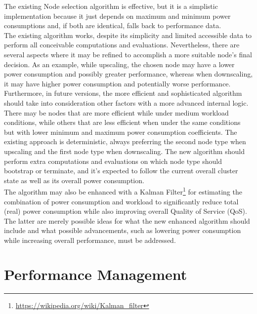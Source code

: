 The existing Node selection algorithm is effective, but it is a simplistic implementation
because it just depends on maximum and minimum power consumptions and, if both
are identical, falls back to performance data. \\ %
The existing algorithm works, despite its simplicity and limited accessible data
to perform all conceivable computations and evaluations. Nevertheless, there are
several aspects where it may be refined to accomplish a more suitable node's
final decision. As an example, while upscaling, the chosen node may have a lower
power consumption and possibly greater performance, whereas when downscaling, it
may have higher power consumption and potentially worse performance. Furthermore,
in future versions, the more efficient and sophisticated algorithm should take
into consideration other factors with a more advanced internal logic. There may be
nodes that are more efficient while under medium workload conditions, while
others that are less efficient when under the same conditions but with lower
minimum and maximum power consumption coefficients. The existing approach is deterministic,
always preferring the second node type when upscaling and the first node type
when downscaling. The new algorithm should perform extra computations and evaluations
on which node type should bootstrap or terminate, and it's expected to follow
the current overall cluster state as well as its overall power consumption. \\ %
The algorithm may also be enhanced with a Kalman Filter\footnote{\url{https://wikipedia.org/wiki/Kalman_filter}}
for estimating the combination of power consumption and workload to
significantly reduce total (real) power consumption while also improving overall
Quality of Service (QoS). \\ %
The latter are merely possible ideas for what the new enhanced algorithm should
include and what possible advancements, such as lowering power consumption while
increasing overall performance, must be addressed.

\section{Performance Management}
\label{subsec:conclusions_limitations_and_future_works_performance_management}

